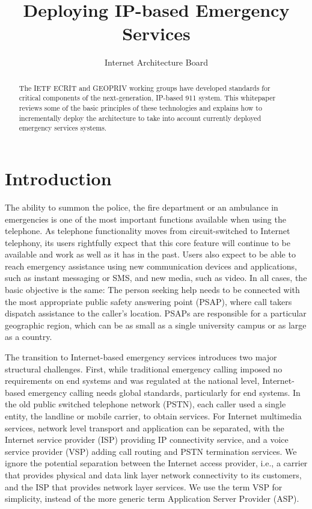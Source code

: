 \documentclass[12pt]{article}
\title{Deploying IP-based Emergency Services}
\author{
Internet Architecture Board 
}
\date{}
\begin{document}
\maketitle

\begin{abstract}
The IETF ECRIT and GEOPRIV working groups have developed standards
for critical components of the next-generation, IP-based 911 system.
This whitepaper reviews some of the basic principles of these technologies
and explains how to incrementally deploy the architecture to take into account currently deployed emergency services systems.  
\end{abstract}


\pagebreak



\section{Introduction}
The ability to summon the police, the fire department or an ambulance in emergencies is one of the most important functions available when using the telephone. As telephone functionality moves from circuit-switched to Internet telephony, its users rightfully expect that this core feature will continue to be available and work as well as it has in the past.  Users also expect to be able to reach emergency assistance using new communication devices and applications, such as instant messaging or SMS, and new media, such as video. In all cases, the basic objective is the same: The person seeking help needs to be connected with the most appropriate public safety answering point (PSAP), where call takers dispatch assistance to the caller's location. PSAPs are responsible for a particular geographic region, which can be as small as a single university campus or as large as a country. 

The transition to Internet-based emergency services introduces two major structural challenges. First, while traditional emergency calling imposed no requirements on end systems and was regulated at the national level, Internet-based emergency calling needs global standards, particularly for end systems. In the old public switched telephone network (PSTN), each caller used a single entity, the landline or mobile carrier, to obtain services. For Internet multimedia services, network level transport and application can be separated, with the Internet service provider (ISP)  providing IP connectivity service, and a voice service provider (VSP)  adding call routing and PSTN termination services. We ignore the potential separation between the Internet access provider, i.e., a carrier that provides physical and data link layer network connectivity to its customers, and the ISP that provides network layer services. We use the term VSP for simplicity, instead of the more generic term Application Server Provider (ASP). 
\end{document}
